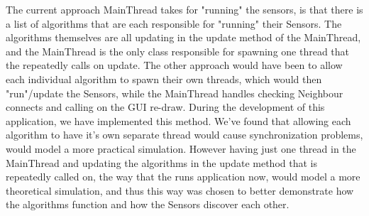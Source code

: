 The current approach MainThread takes for "running" the sensors, is that there is a list of algorithms that are each responsible for "running" their Sensors. The algorithms themselves are all updating in the update method of the MainThread, and the MainThread is the only class responsible for spawning one thread that the repeatedly calls on update. The other approach would have been to allow each individual algorithm to spawn their own threads, which would then "run"/update the Sensors, while the MainThread handles checking Neighbour connects and calling on the GUI re-draw. During the development of this application, we have implemented this method. We've found that allowing each algorithm to have it's own separate thread would cause synchronization problems, would model a more practical simulation. However having just one thread in the MainThread and updating the algorithms in the update method that is repeatedly called on, the way that the runs application now, would model a more theoretical simulation, and thus this way was chosen to better demonstrate how the algorithms function and how the Sensors discover each other.
